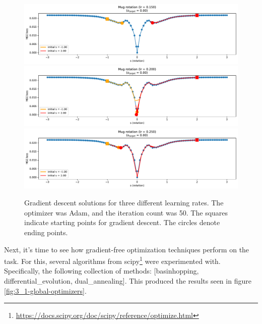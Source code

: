 \begin{figure}[H]
    \centering
    \includegraphics[width=1.0\textwidth]{figures/3_1-mse-gd-rotation-optimization-lr0.15.pdf}
    \includegraphics[width=1.0\textwidth]{figures/3_1-mse-gd-rotation-optimization-lr0.20.pdf}
    \includegraphics[width=1.0\textwidth]{figures/3_1-mse-gd-rotation-optimization-lr0.25.pdf}
    \caption{Gradient descent solutions for three different learning rates. The optimizer was Adam, and the iteration count was 50. The squares indicate starting points for gradient descent. The circles denote ending points.}
    \label{fig:3_1-lr-experiment}
\end{figure}


Next, it's time to see how gradient-free optimization techniques perform on the task. For this, several algorithms from scipy\footnote{\url{https://docs.scipy.org/doc/scipy/reference/optimize.html}} were experimented with. Specifically, the following collection of methods: [basinhopping, differential\_evolution, dual\_annealing]. This produced the results seen in figure \ref{fig:3_1-global-optimizers}.

